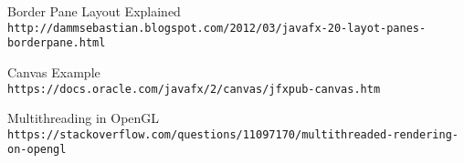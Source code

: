 \documentclass[../../main.tex]{subfiles}
\begin{document}
\begin{thebibliography}{9}
Border Pane Layout Explained\\
\texttt{http://dammsebastian.blogspot.com/2012/03/javafx-20-layot-panes-borderpane.html}

Canvas Example\\
\texttt{https://docs.oracle.com/javafx/2/canvas/jfxpub-canvas.htm}

Multithreading in OpenGL\\
\texttt{https://stackoverflow.com/questions/11097170/multithreaded-rendering-on-opengl}

\end{thebibliography}
\end{document}
